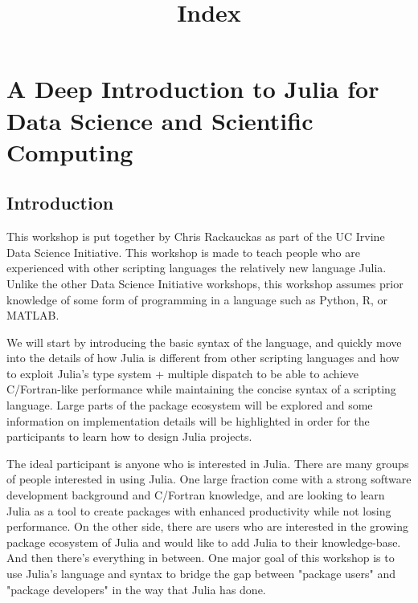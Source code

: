 \documentclass[11pt]{article}
\title{Index}
\begin{document}
    
    
    \maketitle
    
    

    
    \section{A Deep Introduction to Julia for Data Science and Scientific
Computing}\label{a-deep-introduction-to-julia-for-data-science-and-scientific-computing}

    \subsection{Introduction}\label{introduction}

This workshop is put together by Chris Rackauckas as part of the UC
Irvine Data Science Initiative. This workshop is made to teach people
who are experienced with other scripting languages the relatively new
language Julia. Unlike the other Data Science Initiative workshops, this
workshop assumes prior knowledge of some form of programming in a
language such as Python, R, or MATLAB.

We will start by introducing the basic syntax of the language, and
quickly move into the details of how Julia is different from other
scripting languages and how to exploit Julia's type system + multiple
dispatch to be able to achieve C/Fortran-like performance while
maintaining the concise syntax of a scripting language. Large parts of
the package ecosystem will be explored and some information on
implementation details will be highlighted in order for the participants
to learn how to design Julia projects.

The ideal participant is anyone who is interested in Julia. There are
many groups of people interested in using Julia. One large fraction come
with a strong software development background and C/Fortran knowledge,
and are looking to learn Julia as a tool to create packages with
enhanced productivity while not losing performance. On the other side,
there are users who are interested in the growing package ecosystem of
Julia and would like to add Julia to their knowledge-base. And then
there's everything in between. One major goal of this workshop is to use
Julia's language and syntax to bridge the gap between "package users"
and "package developers" in the way that Julia has done.
\end{document}
